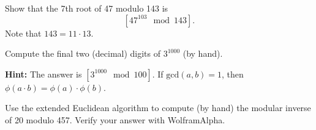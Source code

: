 \documentclass[a4paper,10pt,landscape,twocolumn]{scrartcl}
\begin{document}
\problems

\begin{exercise}
\begin{subex}
Show that the 7th root of 47 modulo 143 is $$[47^{103} \mod 143].$$ Note that $143=11\cdot 13$.
\end{subex}

\begin{subex}
Compute the final two (decimal) digits of $3^{1000}$ (by hand).

\textbf{Hint:} The answer is $[3^{1000} \mod 100]$. If $\text{gcd}(a,b)=1$, then $\phi(a\cdot b)=\phi(a)\cdot\phi(b)$.
\end{subex}

\begin{subex} Use the extended Euclidean algorithm to compute (by
  hand) the modular inverse of 20 modulo 457. Verify your answer with WolframAlpha.
\end{subex}


\end{exercise}


%

\end{document}

